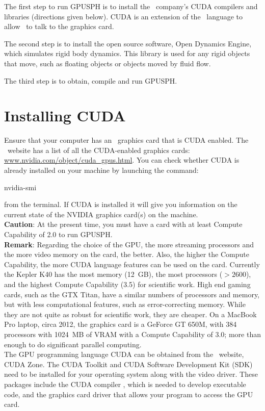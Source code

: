 The first step to run GPUSPH is to install the \nvidia\ company's CUDA
compilers and libraries (directions given below). CUDA is an extension
of the \cpp\ language to allow \cpp\ to talk to the graphics card.

The second step is to install the open source software, Open Dynamics
Engine, which simulates rigid body dynamics. This library is used for
any rigid objects that move, such as floating objects or objects moved
by fluid flow.

The third step is to obtain, compile and run GPUSPH.

\section{Installing CUDA}

Ensure that your computer has an \nvidia\ graphics card that is CUDA
enabled. The \nvidia\ website has a list of all the CUDA-enabled graphics
cards: \url{www.nvidia.com/object/cuda_gpus.html}. You can check whether
CUDA is already installed on your machine by launching the command:
\begin{shellcode}
nvidia-smi
\end{shellcode}
from the terminal. If CUDA is installed it will give you information
on the current state of the NVIDIA graphics card(s) on the machine.\\

\textbf{Caution}: At the present time, you must have a card with at least Compute
Capability of 2.0 to run GPUSPH.
\\

\textbf{Remark}: 
Regarding the choice of the GPU, the more streaming 
processors and the more video memory on the card, the better. 
Also, the higher the Compute Capability, the more
CUDA language features can be used on the card. 
Currently the Kepler
K40 has the most memory (12~GB), the most processors (${}>2600$), and
the highest Compute Capability (3.5) for scientific work. High end
gaming cards, such as the GTX Titan, have a similar numbers of
processors and memory, but with less computational features, such as
error-correcting memory. While they are not quite as robust for
scientific work, they are cheaper. On a MacBook Pro laptop, circa 2012,
the graphics card is a GeForce GT 650M, with 384 processors with 1024~MB
of VRAM with a Compute Capability of 3.0; more than enough to do
significant parallel computing.\\

The GPU programming language CUDA can be obtained from the \nvidia\ website,
CUDA Zone. The CUDA Toolkit and CUDA Software Development Kit (SDK)
need to be installed for your operating system along with the video
driver. These packages include the CUDA compiler , which is
needed to develop executable code, and the graphics card driver that
allows your program to access the GPU card. \\

